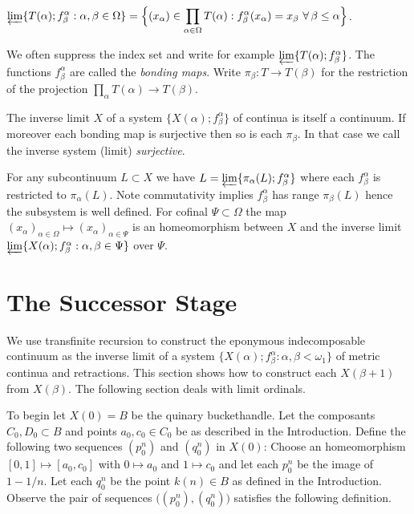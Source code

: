 \documentclass[12pt]{article}
\theoremstyle{plain}
\theoremstyle{definition}
\newcommand{\A}{\ensuremath{\alpha}}
\newcommand{\B}{\ensuremath{\beta}}
\newcommand{\W}{\ensuremath{\omega}}
\newcommand{\WW}{\ensuremath{\Omega}}
\newcommand{\G}{\ensuremath{\gamma}}
\newcommand{\0}{\ensuremath{\varnothing}}
\begin{document}
	\begin{center}                                             
		$\displaystyle \varprojlim \{T(\A); f^\A_\B: \A,\B \in \WW\} = \Big \{(x_\A) \in \prod_{\A \in \WW} T(\A) : f^\A_\B(x_\A) = x_\B \ \forall \, \B \le \A\Big \}$.
	\end{center}
	
	We often suppress the index set and write for example $\varprojlim \{T(\A); f^\A_\B\}$.
	The functions $f^\A_\B$ are called the \textit{bonding maps}.
	Write $\pi_\B : T \to T(\B)$ for the restriction of the projection $\prod_\A T(\A) \to T(\B)$.
	
	The inverse limit $X$ of a system $\{X(\A);f^\A_\B\}$ of continua is itself a continuum.
	If moreover each bonding map is surjective then so is each $\pi_\B$. In that case we call the inverse system (limit) \textit{surjective}.
	
	For any subcontinuum $L \subset X$ we have $L = \varprojlim \{\pi_\A(L); f^\A_\B\}$ 
	where each $f^\A_\B$ is restricted to $\pi_\A(L)$.
	Note commutativity implies $f^\A_\B$ has range $\pi_\B(L)$ hence the subsystem is well defined.
	For cofinal $\Psi \subset \WW$ the map $\displaystyle  (x_\A)_{\A \in \WW} \mapsto (x_\A)_{\A \in \Psi}$ 
	is an homeomorphism between $X$ and the inverse limit $\varprojlim \{X(\A);f^\A_\B: \A,\B \in \Psi\}$ over $\Psi$.
	
	\section{The Successor Stage}\label{4Sec2}
	
	\noindent
	We use transfinite recursion to construct the eponymous indecomposable continuum as the inverse limit of a system \mbox{$\{X(\A); f^\A_\B : \A,\B< \W_1\}$} of metric continua and retractions. This section shows how to construct each $X(\B+1)$ from $X(\B)$. The following section deals with limit ordinals.
	
	To begin let $X(0) = B$ be the quinary buckethandle.
	Let the composants $C_0,D_0 \subset B$ and points $a_0,c_0 \in C_0$ be as described in the Introduction. Define the following two sequences $(p^n_0)$ and $(q^n_0)$ in $X(0)$: Choose an homeomorphism $[0,1] \mapsto [a_0,c_0] $ with $0 \mapsto a_0$ and $1 \mapsto c_0$ and let each $p_0^n$ be the image of $1-1/n$. Let each $q^n_0$ be the point $k(n) \in B$ as defined in the Introduction.
	Observe the pair of sequences $\big ( (p^n_0),(q^n_0) \big )$ satisfies the following definition.
	
\end{document}
